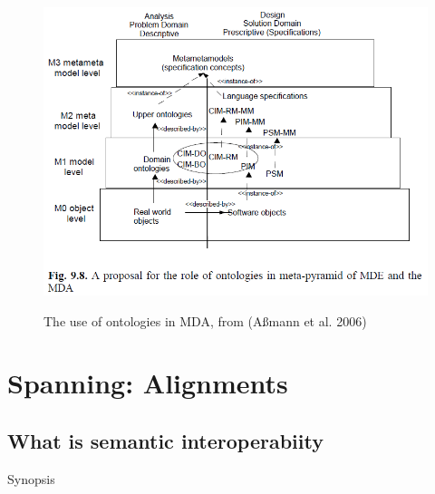 \documentclass[a4paper,11pt,oneside,oldfontcommands]{memoir}
\theoremstyle{definition}
\theoremstyle{break}		%
\numberwithin{equation}{chapter}
\numberwithin{figure}{chapter}
\begin{document}
\begin{figure}
\hypertarget{fig:OntosInMDE}{%
\centering
\includegraphics[width=5.91667in,height=3.60417in]{src/images/OntosInMDE.png}
\caption{The use of ontologies in MDA, from (Aßmann et al.
2006)}\label{fig:OntosInMDE}
}
\end{figure}

\hypertarget{spanning-alignments}{%
\chapter{Spanning: Alignments}\label{spanning-alignments}}

\hypertarget{what-is-semantic-interoperabiity}{%
\section{What is semantic
interoperabiity}\label{what-is-semantic-interoperabiity}}

Synopsis
\end{document}
